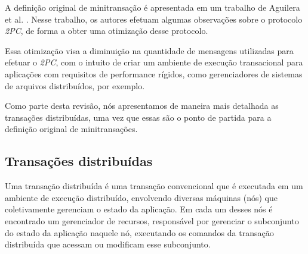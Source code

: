 \documentclass[11pt,twoside,a4paper]{book}
\begin{document}



A definição original de minitransação é apresentada em um trabalho de Aguilera et al. \cite{sinfonia}. Nesse trabalho, os autores efetuam algumas observações sobre o protocolo \emph{2PC}, de forma a obter uma otimização desse protocolo. 

Essa otimização visa a diminuição na quantidade de mensagens utilizadas para efetuar o \emph{2PC}, com o intuito de criar um ambiente de execução transacional para aplicações com requisitos de performance rígidos, como gerenciadores de sistemas de arquivos distribuídos, por exemplo. 

Como parte desta revisão, nós apresentamos de maneira mais detalhada as transações distribuídas, uma vez que essas são o  ponto de partida para a definição original de minitransações.





\subsection{Transações distribuídas}
\label{subsec:transacoes_distribuidas}
Uma transação distribuída é uma transação convencional que é executada em um ambiente de execução distribuído, envolvendo diversas máquinas (nós) que coletivamente gerenciam o estado da aplicação. Em cada um desses nós é encontrado um gerenciador de recursos, responsável por gerenciar o subconjunto do estado da aplicação naquele nó, executando os comandos da transação distribuída que acessam ou modificam esse subconjunto.
\end{document}
